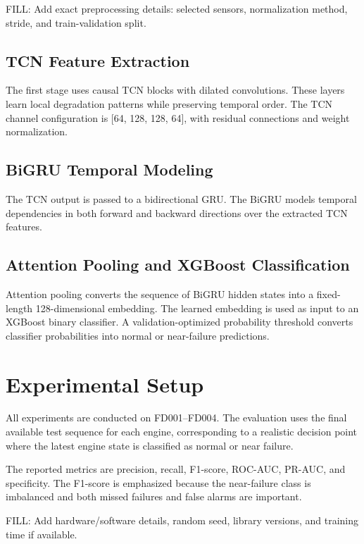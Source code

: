 \documentclass[conference]{IEEEtran}
\begin{document}
FILL: Add exact preprocessing details: selected sensors, normalization method, stride, and train-validation split.

\subsection{TCN Feature Extraction}

The first stage uses causal TCN blocks with dilated convolutions. These layers learn local degradation patterns while preserving temporal order. The TCN channel configuration is [64, 128, 128, 64], with residual connections and weight normalization.

\subsection{BiGRU Temporal Modeling}

The TCN output is passed to a bidirectional GRU. The BiGRU models temporal dependencies in both forward and backward directions over the extracted TCN features.

\subsection{Attention Pooling and XGBoost Classification}

Attention pooling converts the sequence of BiGRU hidden states into a fixed-length 128-dimensional embedding. The learned embedding is used as input to an XGBoost binary classifier. A validation-optimized probability threshold converts classifier probabilities into normal or near-failure predictions.



\section{Experimental Setup}

All experiments are conducted on FD001--FD004. The evaluation uses the final available test sequence for each engine, corresponding to a realistic decision point where the latest engine state is classified as normal or near failure.

The reported metrics are precision, recall, F1-score, ROC-AUC, PR-AUC, and specificity. The F1-score is emphasized because the near-failure class is imbalanced and both missed failures and false alarms are important.

FILL: Add hardware/software details, random seed, library versions, and training time if available.
\end{document}
